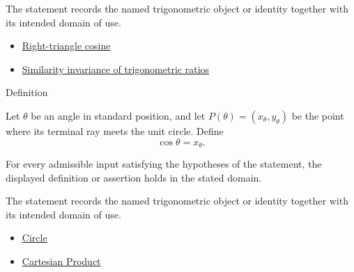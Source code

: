 \begin{remark*}[Interpretation]
The statement records the named trigonometric object or identity together with
its intended domain of use.
\end{remark*}

\begin{dependencies}
\begin{itemize}
  \item \hyperref[def:right-triangle-cosine]{Right-triangle cosine}
  \item \hyperref[thm:trig-ratios-similarity-invariant]{Similarity invariance of trigonometric ratios}
\end{itemize}
\end{dependencies}



\begin{definitionbox}{Definition}
\begin{definition}
\label{def:unit-circle-cosine}
Let $\theta$ be an angle in standard position, and let $P(\theta)=(x_\theta,
y_\theta)$ be the point where its terminal ray meets the unit circle. Define
\[
  \cos\theta=x_\theta.
\]
\end{definition}
\end{definitionbox}
\begin{remark*}
For every admissible input satisfying the hypotheses of the statement, the
displayed definition or assertion holds in the stated domain.
\end{remark*}

\begin{remark*}[Interpretation]
The statement records the named trigonometric object or identity together with
its intended domain of use.
\end{remark*}

\begin{dependencies}
\begin{itemize}
  \item \hyperref[def:euclid-circle]{Circle}
  \item \hyperref[def:cartesian-product]{Cartesian Product}
\end{itemize}
\end{dependencies}
